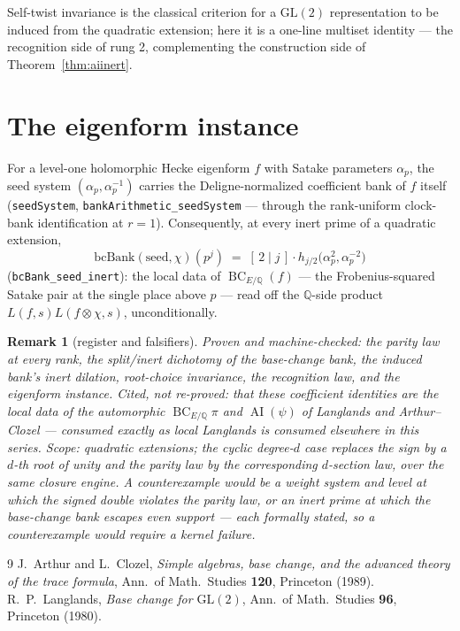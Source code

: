 \documentclass[11pt]{article}
\newtheorem{remark}[theorem]{Remark}
\newcommand{\AI}{\operatorname{AI}}
\newcommand{\BC}{\operatorname{BC}}
\begin{document}
Self-twist invariance is the classical criterion for a $\mathrm{GL}(2)$ representation to
be induced from the quadratic extension; here it is a one-line multiset identity — the
recognition side of rung 2, complementing the construction side of Theorem~\ref{thm:aiinert}.

\section{The eigenform instance}

For a level-one holomorphic Hecke eigenform $f$ with Satake parameters $\alpha_p$, the seed
system $(\alpha_p,\alpha_p^{-1})$ carries the Deligne-normalized coefficient bank of $f$
itself (\texttt{seedSystem}, \texttt{bankArithmetic\_seedSystem} — through the rank-uniform
clock-bank identification at $r=1$).  Consequently, at every inert prime of a quadratic
extension,
\[
  \mathrm{bcBank}(\text{seed},\chi)(p^j)\;=\;[\,2\mid j\,]\cdot
    h_{j/2}\bigl(\alpha_p^2,\alpha_p^{-2}\bigr)
\]
(\texttt{bcBank\_seed\_inert}): the local data of $\BC_{E/\mathbb Q}(f)$ — the
Frobenius-squared Satake pair at the single place above $p$ — read off the $\mathbb Q$-side product
$L(f,s)L(f\otimes\chi,s)$, unconditionally.

\begin{remark}[register and falsifiers]
Proven and machine-checked: the parity law at every rank, the split/inert dichotomy of the
base-change bank, the induced bank's inert dilation, root-choice invariance, the
recognition law, and the eigenform instance.  Cited, not re-proved: that these coefficient
identities are the local data of the automorphic $\BC_{E/\mathbb Q}\pi$ and $\AI(\psi)$ of
Langlands and Arthur--Clozel \cite{AC} --- consumed exactly as local Langlands is consumed
elsewhere in this series.  Scope: quadratic extensions; the cyclic degree-$d$ case replaces
the sign by a $d$-th root of unity and the parity law by the corresponding $d$-section law,
over the same closure engine.  A counterexample would be a weight system and level at which
the signed double violates the parity law, or an inert prime at which the base-change bank
escapes even support --- each formally stated, so a counterexample would require a kernel
failure.
\end{remark}

\begin{thebibliography}{9}
 J.~Arthur and L.~Clozel, \emph{Simple algebras, base change, and the advanced
theory of the trace formula}, Ann.\ of Math.\ Studies \textbf{120}, Princeton (1989).
 R.~P.~Langlands, \emph{Base change for $\mathrm{GL}(2)$}, Ann.\ of Math.\
Studies \textbf{96}, Princeton (1980).
\end{thebibliography}
\end{document}
